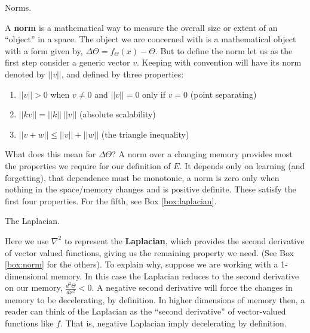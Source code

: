 \begin{featurebox}
\caption{Norms.}
\label{box:norm}
A \textbf{norm} is a mathematical way to measure the overall size or extent of an ``object'' in a space. The object we are concerned with is a mathematical object with a form given by, $\Delta \Theta = f_{\Theta}(x) - \Theta$. But to define the norm let us as the first step consider a generic vector $v$. Keeping with convention will have its norm denoted by $||v||$, and defined by three properties:

\begin{enumerate}
  \item $||v|| > 0$ when $v \neq 0$ and $||v|| = 0$ only if $v=0$ (point separating)
  \item $||k v|| = ||k||\ ||v||$ (absolute scalability)
  \item $||v + w|| \leq ||v|| + ||w||$ (the triangle inequality)
\end{enumerate}

What does this mean for $\Delta \Theta$? A norm over a changing memory provides most the properties we require for our definition of $E$. It depends only on learning (and forgetting), that dependence must be monotonic, a norm is zero only when nothing in the space/memory changes and is positive definite. These satisfy the first four properties. For the fifth, see Box \ref{box:laplacian}.
\medskip
\end{featurebox}

\begin{featurebox}
	\caption{The Laplacian.}
	\label{box:laplacian}
	Here we use $\nabla^2$ to represent the \textbf{Laplacian}, which provides the second derivative of vector valued functions, giving us the remaining property we need. (See Box \ref{box:norm} for the others). To explain why, suppose we are working with a 1- dimensional memory. In this case the Laplacian reduces to the second derivative on our memory, $\frac{d^2\Theta}{dx^2} < 0$. A negative second derivative will force the changes in memory to be decelerating, by definition. In higher dimensions of memory then, a reader can think of the Laplacian as the ``second derivative'' of vector-valued functions like $f$. That is, negative Laplacian imply decelerating by definition.
	\medskip
\end{featurebox}


